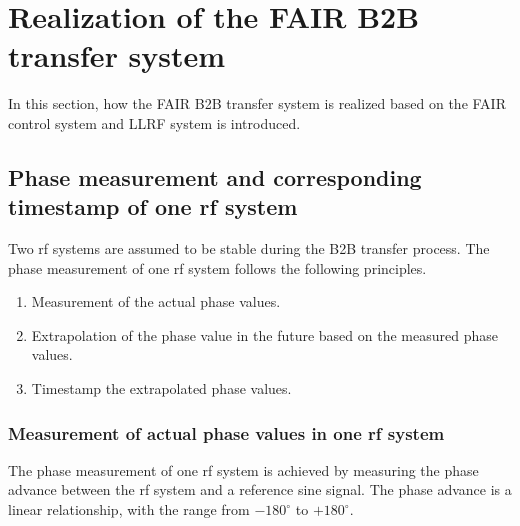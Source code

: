 \section{Realization of the FAIR B2B transfer system}
In this section, how the FAIR B2B transfer system is realized based on the FAIR control system and LLRF system is introduced.
%
\subsection{Phase measurement and corresponding timestamp of one rf system}
Two rf systems are assumed to be stable during the B2B transfer process. The phase measurement of one rf system follows the following principles.
\begin{enumerate}
\item Measurement of the actual phase values.
\item Extrapolation of the phase value in the future based on the measured phase values.
\item Timestamp the extrapolated phase values.
\end{enumerate}
 \subsubsection{Measurement of actual phase values in one rf system}
The phase measurement of one rf system is achieved by measuring the phase advance between the rf system and a reference sine signal. The phase advance is a linear relationship, with the range from $-180^\circ$ to $+180^\circ$. 

